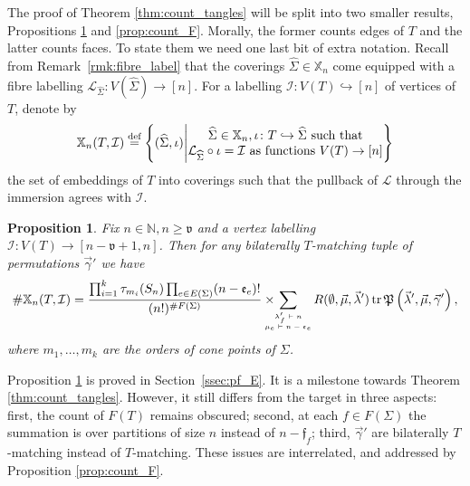 \documentclass{amsart}
\newtheorem{proposition}[conjecture]{Proposition}
\newcommand{\covers}{\mathbb{X}_n}
\newcommand{\defeq}{\stackrel{\tn{def}}{=}}
\newcommand{\tn}{\textnormal}
\newcommand{\tr}{\operatorname{tr}}
\newcommand{\whS}{{\widehat{\Sigma}}}
\begin{document}
The proof of Theorem \ref{thm:count_tangles} will be split into two smaller results, Propositions \ref{prop:count_E} and \ref{prop:count_F}. Morally, the former counts edges of $T$ and the latter counts faces. To state them we need one last bit of extra notation. Recall from Remark~\ref{rmk:fibre_label} that the coverings $\whS\in\covers$ come equipped with a fibre labelling $\mathcal{L}_{\whS}\colon V(\whS)\to[n]$. For a labelling $\mathcal{I}\colon V(T)\hookrightarrow[n]$ of vertices of $T$, denote by
\begin{equation}\label{eq:vertex_labelling_pullback}
\covers(T,\mathcal{I})\defeq\left\{(\widehat{\Sigma},\iota)\Bigg|\begin{matrix}\widehat{\Sigma}\in\covers,\iota\colon T\hookrightarrow\whS\text{ such that}\\\mathcal{L}_{\whS}\circ\iota=\mathcal{I}\text{ as functions }V(T)\to[n]\end{matrix}\right\}
\end{equation}
the set of embeddings of $T$ into coverings such that the pullback of $\mathcal{L}$ through the immersion agrees with $\mathcal{I}$.
\begin{proposition}\label{prop:count_E}
Fix $n\in\mathbb{N},n\geqslant\mathfrak{v}$ and a vertex labelling $\mathcal{I}\colon V(T)\to[n-\mathfrak{v}+1,n]$. Then for any bilaterally $T$-matching tuple of permutations $\vec\gamma'$ we have
\begin{equation*}
\#\covers(T,\mathcal{I})=\frac{\prod_{i=1}^k\tau_{m_i}(S_n)\prod_{e\in E(\Sigma)}(n-\mathfrak{e}_e)!}{(n!)^{\#F(\Sigma)}}\times\hspace*{-10pt}\sum_{\tiny\begin{matrix}\lambda'_f\vdash n\\\mu_e\vdash n-\mathfrak{e}_e\end{matrix}}R(\emptyset,\vec\mu,\vec\lambda')\tr\mathfrak{P}\left(\vec\lambda',\vec\mu,\vec\gamma'\right),
\end{equation*}
where $m_1,\dots,m_k$ are the orders of cone points of $\Sigma$.
\end{proposition}
Proposition \ref{prop:count_E} is proved in Section~\ref{ssec:pf_E}. It is a milestone towards Theorem \ref{thm:count_tangles}. However, it still differs from the target in three aspects: first, the count of $F(T)$ remains obscured; second, at each $f\in F(\Sigma)$ the summation is over partitions of size $n$ instead of $n-\mathfrak{f}_f$; third, $\vec\gamma'$ are bilaterally $T$-matching instead of $T$-matching. These issues are interrelated, and addressed by Proposition \ref{prop:count_F}.
\end{document}
